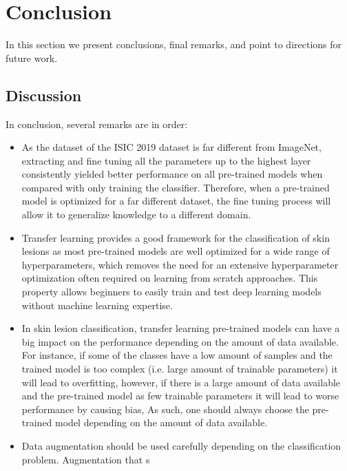 \chapter{Conclusion}
\label{chapter:conclusion}

In this section we present conclusions, final remarks, and point to directions for future work.

\section{Discussion}

    In conclusion, several remarks are in order:
    
    \begin{itemize}
        \item As the dataset of the ISIC 2019 dataset is far different from ImageNet, extracting and fine tuning all the parameters up to the highest layer consistently yielded better performance on all pre-trained models when compared with only training the classifier. Therefore, when a pre-trained model is optimized for a far different dataset, the fine tuning process will allow it to generalize knowledge to a different domain.
    
        \item Transfer learning provides a good framework for the classification of skin lesions as most pre-trained models are well optimized for a wide range of hyperparameters, which removes the need for an extensive hyperparameter optimization often required on learning from scratch approaches. This property allows beginners to easily train and test deep learning models without machine learning expertise.    
    
        \item In skin lesion classification, transfer learning pre-trained models can have a big impact on the performance depending on the amount of data available. For instance, if some of the classes have a low amount of samples and the trained model is too complex (i.e. large amount of trainable parameters) it will lead to overfitting, however, if there is a large amount of data available and the pre-trained model as few trainable parameters it will lead to worse performance by causing bias, As such, one should always choose the pre-trained model depending on the amount of data available.
        
        \item Data augmentation should be used carefully depending on the classification problem. Augmentation that s
    \end{itemize}

